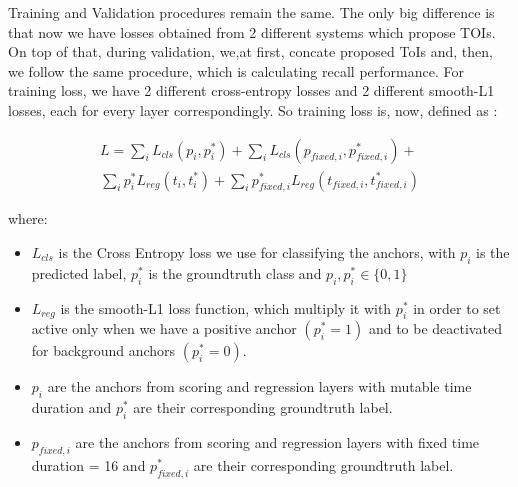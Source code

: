 \par
Training and Validation procedures remain the same. The only big difference is that now we have losses obtained from 2 different systems which propose TOIs. On top of that,
during validation, we,at first, concate proposed ToIs and, then, we follow the same procedure, which is calculating recall performance. For training loss, we have 2 different cross-entropy losses and 2 different smooth-L1 losses, each for every
layer correspondingly. So training loss is, now, defined as :





\begin{equation} 
\begin{split}
 L  =  \sum_iL_{cls}(p_i, p_i^*) + \sum_iL_{cls}(p_{fixed,i}, p_{fixed,i}^*) + \\
   \sum_ip_i^*L_{reg}(t_i,t_i^*) + \sum_ip_{fixed,i}^*L_{reg}(t_{fixed,i},t_{fixed,i}^*) 
\end{split}
\end{equation}

where:
\begin{itemize}
  \item $L_{cls} $ is the Cross Entropy loss we use for classifying the anchors, with $p_i$ is the predicted label, $p_i^*$ is the groundtruth class and
  $p_i, p_i^* \in \{0,1\}$
\item $L_{reg} $ is the smooth-L1 loss function, which multiply it with $p_i^*$ in order to set active only when we have a positive anchor $(p_i^* = 1)$
  and to be deactivated for background anchors $(p_i^* = 0)$.
\item $p_i $ are the anchors from scoring and regression layers with mutable time duration and $p_i^*$ are their corresponding groundtruth label.
\item $p_{fixed,i} $ are the anchors from scoring and regression layers with fixed time duration = 16 and $p_{fixed,i}^*$ are their corresponding groundtruth label.
\end{itemize}

